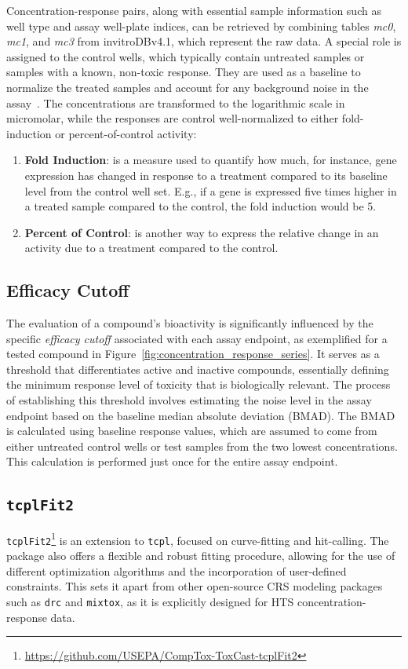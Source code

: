 Concentration-response pairs, along with essential sample information such as well type and assay well-plate indices, can be retrieved by combining tables \emph{mc0}, \emph{mc1}, and \emph{mc3} from invitroDBv4.1, which represent the raw data. A special role is assigned to the control wells, which typically contain untreated samples or samples with a known, non-toxic response. They are used as a baseline to normalize the treated samples and account for any background noise in the assay~\cite{sheffield2021}. The concentrations are transformed to the logarithmic scale in micromolar, while the responses are control well-normalized to either fold-induction or percent-of-control activity:

\begin{enumerate}
    \item \textbf{Fold Induction}: is a measure used to quantify how much, for instance, gene expression has changed in response to a treatment compared to its baseline level from the control well set. E.g., if a gene is expressed five times higher in a treated sample compared to the control, the fold induction would be 5.
    \item \textbf{Percent of Control}: is another way to express the relative change in an activity due to a treatment compared to the control.
\end{enumerate}



\subsection{Efficacy Cutoff}\label{sec:efficacy_cutoff}
The evaluation of a compound's bioactivity is significantly influenced by the specific \emph{efficacy cutoff} associated with each assay endpoint, as exemplified for a tested compound in Figure~\ref{fig:concentration_response_series}. It serves as a threshold that differentiates active and inactive compounds, essentially defining the minimum response level of toxicity that is biologically relevant. The process of establishing this threshold involves estimating the noise level in the assay endpoint based on the baseline median absolute deviation (BMAD). The BMAD is calculated using baseline response values, which are assumed to come from either untreated control wells or test samples from the two lowest concentrations. This calculation is performed just once for the entire assay endpoint.

\subsection{\texttt{tcplFit2}}\label{sec:tcplfit2}
\texttt{tcplFit2}\footnote{\url{https://github.com/USEPA/CompTox-ToxCast-tcplFit2}} is an extension to \texttt{tcpl}, focused on curve-fitting and hit-calling. The package also offers a flexible and robust fitting procedure, allowing for the use of different optimization algorithms and the incorporation of user-defined constraints. This sets it apart from other open-source CRS modeling packages such as \texttt{drc} and \texttt{mixtox}, as it is explicitly designed for HTS concentration-response data.

